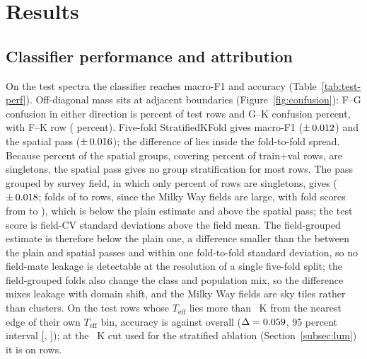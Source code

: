 \documentclass[11pt,a4paper]{article}
\newcommand{\Teff}{$T_{\mathrm{eff}}$\xspace}
\begin{document}
\section{Results}
\label{sec:results}

\subsection{Classifier performance and attribution}
\label{subsec:perf}

On the \nTest{} test spectra the classifier reaches macro-F1 \testMacroF{} and accuracy \testAcc{} (Table~\ref{tab:test-perf}). Off-diagonal mass sits at adjacent boundaries (Figure~\ref{fig:confusion}): F--G confusion in either direction is \adjFG{} percent of test rows and G--K confusion \adjGK{} percent, with \adjFKRows{} F--K row (\adjFKPct{} percent). Five-fold StratifiedKFold gives macro-F1 \cvMean{} ($\pm\,0.012$) and the spatial pass \cvSpatMean{} ($\pm\,0.016$); the difference of \cvGap{} lies inside the fold-to-fold spread. Because \singGroupPct{} percent of the spatial groups, covering \singRowPct{} percent of train+val rows, are singletons, the spatial pass gives no group stratification for most rows. The pass grouped by survey field, in which only \cvFldSingRowPct{} percent of rows are singletons, gives \cvFldMean{} ($\pm\,0.018$; folds of \cvFldFoldRowsMin{} to \cvFldFoldRowsMax{} rows, since the Milky Way fields are large, with fold scores from \cvFldFoldMin{} to \cvFldFoldMax), which is \cvFldGapPlain{} below the plain estimate and \cvFldGapSpatial{} above the spatial pass; the test score is \cvFldTestZ{} field-CV standard deviations above the field mean. The field-grouped estimate is therefore \cvFldGapPlain{} below the plain one, a difference smaller than the \cvGap{} between the plain and spatial passes and within one fold-to-fold standard deviation, so no field-mate leakage is detectable at the resolution of a single five-fold split; the field-grouped folds also change the class and population mix, so the difference mixes leakage with domain shift, and the Milky Way fields are sky tiles rather than clusters. On the \bdN{} test rows whose \Teff lies more than \bdThresh~K from the nearest edge of their own \Teff bin, accuracy is \bdFiltAcc{} against \bdFullAcc{} overall ($\Delta = 0.059$, 95 percent interval [\bdCiLo, \bdCiHi]); at the \bdCut~K cut used for the stratified ablation (Section~\ref{subsec:lum}) it is \bdOneFiftyAcc{} on \bdOneFiftyN{} rows.
\end{document}
